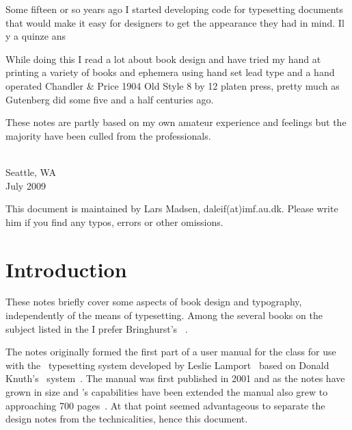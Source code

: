\documentclass[10pt,a4paper,extrafontsizes]{memoir}
\begin{document}
\begin{paracol}{2}
\switchEng
    Some fifteen or so years ago I started developing code for typesetting
documents that would make it easy for designers to get the appearance
they had in mind.
\switchFrench
    Il y a quinze ans

\switchEng
\switchFrench

\switchEng
   While doing this I read a lot about book design and have tried my hand
at printing a variety of books and ephemera using hand set lead type 
and a hand operated Chandler \& Price 1904 Old Style 8 by 12 platen
press, pretty much as Gutenberg did some five and a half centuries ago.

\switchEng
   These notes are partly based on my own amateur
experience and feelings but the majority have been culled from the
professionals.

\switchEng
{ \\ Seattle, WA \\ July 2009\par}


\vskip 3cm

\switchEng
\noindent
This document is maintained by Lars Madsen,
daleif(at)imf.au.dk. Please write him if you find any typos, errors or
other omissions.

\end{paracol}






\chapter{Introduction}

\begin{paracol}{2}
\switchEng
    These notes briefly cover some aspects of book design and typography, 
independently of the means of typesetting. Among
the several books on the subject listed in the \bibname{} I prefer
Bringhurst's ~\autocite{BRINGHURST99}.

\switchEng
    The notes originally formed the first part of a user manual for
the  class for 
use with the \ltx\ typesetting system developed by Leslie 
Lamport~\autocite{LAMPORT94} based 
on Donald Knuth's \tx\ system~\autocite{TEXBOOK}. 
The manual was first published in 2001
and as the notes have grown in size and 's capabilities 
have been extended the manual also grew to approaching 700 pages~\autocite{MEMMAN}. 
At that point seemed advantageous to separate the design notes from the 
technicalities, hence this document.

\end{paracol}
\end{document}
